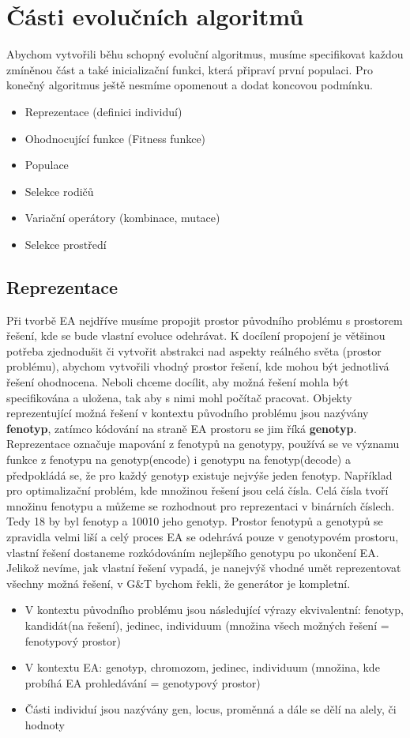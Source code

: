 \section{Části evolučních algoritmů}
Abychom vytvořili běhu schopný evoluční algoritmus, musíme specifikovat každou zmíněnou část a také inicializační funkci, která připraví první populaci. Pro konečný algoritmus ještě nesmíme opomenout a dodat koncovou podmínku. 
\begin{itemize}
\item{Reprezentace (definici individuí)}
\item{Ohodnocující funkce (Fitness funkce)}
\item{Populace}
\item{Selekce rodičů}
\item{Variační operátory (kombinace, mutace)}
\item{Selekce prostředí}
\end{itemize}
\subsection{Reprezentace}
Při tvorbě EA nejdříve musíme propojit prostor původního problému s prostorem řešení, kde se bude vlastní evoluce odehrávat. K docílení propojení je většinou potřeba zjednodušit či vytvořit abstrakci nad aspekty reálného světa (prostor problému), abychom vytvořili vhodný prostor řešení, kde mohou být jednotlivá řešení ohodnocena. Neboli chceme docílit, aby možná řešení mohla být specifikována a uložena, tak aby s nimi mohl počítač pracovat. Objekty reprezentující možná řešení v kontextu původního problému jsou nazývány \textbf{fenotyp}, zatímco kódování na straně EA prostoru se jim říká \textbf{genotyp}. Reprezentace označuje mapování z fenotypů na genotypy, používá se ve významu funkce z fenotypu na genotyp(encode) i genotypu na fenotyp(decode) a předpokládá se, že pro každý genotyp existuje nejvýše jeden fenotyp. Například pro optimalizační problém, kde množinou řešení jsou celá čísla. Celá čísla tvoří množinu fenotypu a můžeme se rozhodnout pro reprezentaci v binárních číslech. Tedy 18 by byl fenotyp a 10010 jeho genotyp. Prostor fenotypů a genotypů se zpravidla velmi liší a celý proces EA se odehrává pouze v genotypovém prostoru, vlastní řešení dostaneme rozkódováním nejlepšího genotypu po ukončení EA. Jelikož nevíme, jak vlastní řešení vypadá, je nanejvýš vhodné umět reprezentovat všechny možná řešení, v G\&T bychom řekli, že generátor je kompletní.
\begin{itemize}   
  \item V kontextu původního problému jsou následující výrazy ekvivalentní: fenotyp, kandidát(na řešení), jedinec, individuum (množina všech možných řešení = fenotypový prostor)
  \item V kontextu EA: genotyp, chromozom, jedinec, individuum (množina, kde probíhá EA prohledávání = genotypový prostor)
  \item Části individuí jsou nazývány gen, locus, proměnná a dále se dělí na alely, či hodnoty
  \end{itemize}
